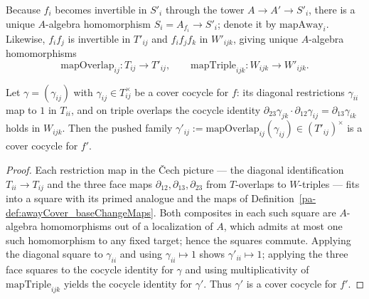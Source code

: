 \begin{definition}
  \label{pa-def:awayCover_baseChangeMaps}
  \leanok

  Because \(f_i\) becomes invertible in \(S'_i\) through the tower \(A \to A' \to S'_i\),
  there is a unique \(A\)-algebra homomorphism \(S_i = A_{f_i} \to S'_i\); denote it by
  \(\mathrm{mapAway}_i\).  Likewise, \(f_i f_j\) is invertible in \(T'_{ij}\) and
  \(f_i f_j f_k\) in \(W'_{ijk}\), giving unique \(A\)-algebra homomorphisms
  \[
    \mathrm{mapOverlap}_{ij} \colon T_{ij} \to T'_{ij}, \qquad
    \mathrm{mapTriple}_{ijk} \colon W_{ijk} \to W'_{ijk}.
  \]
\end{definition}

\begin{theorem}
  \label{pa-thm:awayCover_isCoverCocycle_baseChange}
  \leanok

  Let \(\gamma = (\gamma_{ij})\) with \(\gamma_{ij} \in T_{ij}^{\times}\) be a cover cocycle
  for \(f\): its diagonal restrictions \(\gamma_{ii}\) map to \(1\) in \(T_{ii}\), and on
  triple overlaps the cocycle identity
  \(\partial_{23}\gamma_{jk} \cdot \partial_{12}\gamma_{ij} = \partial_{13}\gamma_{ik}\) holds
  in \(W_{ijk}\).  Then the pushed family
  \(\gamma'_{ij} := \mathrm{mapOverlap}_{ij}(\gamma_{ij}) \in (T'_{ij})^{\times}\) is a cover
  cocycle for \(f'\).
\end{theorem}
\begin{proof}
  \leanok
  Each restriction map in the \v Cech picture — the diagonal identification \(T_{ii} \to
  T_{ij}\) and the three face maps \(\partial_{12}, \partial_{13}, \partial_{23}\) from
  \(T\)-overlaps to \(W\)-triples — fits into a square with its primed analogue and the maps of
  Definition~\ref{pa-def:awayCover_baseChangeMaps}.  Both composites in each such square are
  \(A\)-algebra homomorphisms out of a localization of \(A\), which admits at most one such
  homomorphism to any fixed target; hence the squares commute.  Applying the diagonal square to
  \(\gamma_{ii}\) and using \(\gamma_{ii} \mapsto 1\) shows \(\gamma'_{ii} \mapsto 1\); applying
  the three face squares to the cocycle identity for \(\gamma\) and using multiplicativity of
  \(\mathrm{mapTriple}_{ijk}\) yields the cocycle identity for \(\gamma'\).  Thus \(\gamma'\) is
  a cover cocycle for \(f'\).
\end{proof}

